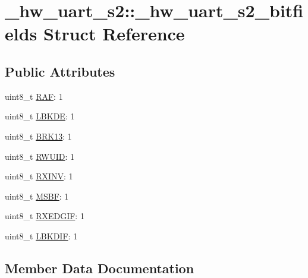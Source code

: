 \hypertarget{struct__hw__uart__s2_1_1__hw__uart__s2__bitfields}{}\section{\+\_\+hw\+\_\+uart\+\_\+s2\+:\+:\+\_\+hw\+\_\+uart\+\_\+s2\+\_\+bitfields Struct Reference}
\label{struct__hw__uart__s2_1_1__hw__uart__s2__bitfields}
\subsection*{Public Attributes}
\begin{DoxyCompactItemize}
\item 
uint8\+\_\+t \hyperlink{struct__hw__uart__s2_1_1__hw__uart__s2__bitfields_a3990347b024c823702edc02a39126e6d}{R\+AF}\+: 1
\item 
uint8\+\_\+t \hyperlink{struct__hw__uart__s2_1_1__hw__uart__s2__bitfields_a78f6c842181a5a01482dba5c67d0f9f0}{L\+B\+K\+DE}\+: 1
\item 
uint8\+\_\+t \hyperlink{struct__hw__uart__s2_1_1__hw__uart__s2__bitfields_ac41af3c9f1cc57d27180fd71b731e621}{B\+R\+K13}\+: 1
\item 
uint8\+\_\+t \hyperlink{struct__hw__uart__s2_1_1__hw__uart__s2__bitfields_a3fce76419e4151179073d7d36067db71}{R\+W\+U\+ID}\+: 1
\item 
uint8\+\_\+t \hyperlink{struct__hw__uart__s2_1_1__hw__uart__s2__bitfields_a2280626efede56d86b0964c3a76ef546}{R\+X\+I\+NV}\+: 1
\item 
uint8\+\_\+t \hyperlink{struct__hw__uart__s2_1_1__hw__uart__s2__bitfields_ac6dfb516f225545bb8cab4a1ff60f380}{M\+S\+BF}\+: 1
\item 
uint8\+\_\+t \hyperlink{struct__hw__uart__s2_1_1__hw__uart__s2__bitfields_ad7cb2c63bb5591e25d8540afe639d6b7}{R\+X\+E\+D\+G\+IF}\+: 1
\item 
uint8\+\_\+t \hyperlink{struct__hw__uart__s2_1_1__hw__uart__s2__bitfields_a0f0ebd9bfbb7469f26ff2e5c2e872ad9}{L\+B\+K\+D\+IF}\+: 1
\end{DoxyCompactItemize}


\subsection{Member Data Documentation}

